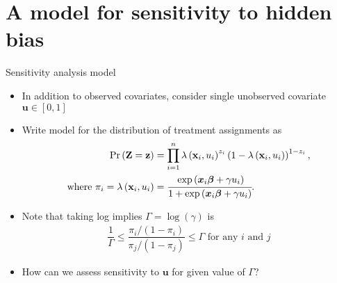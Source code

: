 \documentclass[table, xcolor={dvipsnames}, 9pt]{beamer}
\theoremstyle{newstyle}
\begin{document}
\section{A model for sensitivity to hidden bias}
\begin{frame}{Sensitivity analysis model}
\vfill
\begin{itemize}
\item In addition to observed covariates, consider single unobserved covariate $\bm{u} \in [0, 1]$ \pause \vfill
\item Write model for the distribution of treatment assignments as \pause \vfill
\begin{align*} 
\Pr\left(\mathbf{Z} = \mathbf{z}\right) & = \prod \limits_{i = 1}^n \lambda\left(\mathbf{x}_i, u_i\right)^{z_i} \left(1 - \lambda\left(\mathbf{x}_i, u_i\right)\right)^{1 - z_i}, \\
\text{where } \pi_i = \lambda\left(\mathbf{x}_i, u_i\right) & = \cfrac{\exp\left(\bm{x}_i\bm{\beta} + \gamma u_i\right)}{1 + \exp\left(\bm{x}_i\bm{\beta} + \gamma u_i\right)}.
\end{align*} \vfill
\item \pause Note that taking log implies $\Gamma = \log(\gamma)$ is \vfill
\begin{align*}
\dfrac{1}{\Gamma} \leq \dfrac{\pi_i / (1 - \pi_i)}{\pi_j / (1 - \pi_j)} \leq \Gamma \text{ for any } i \text{ and } j
\end{align*} \vfill
\item \pause How can we assess sensitivity to $\bm{u}$ for given value of $\Gamma$? \vfill
\end{itemize}
\end{frame}
\end{document}
